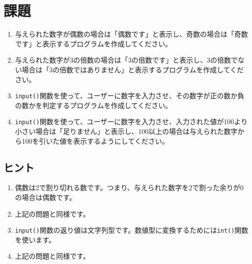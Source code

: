 \documentclass[a4paper,titlepage,dvipdfmx]{jarticle}
\begin{document}
\section{課題}
\begin{enumerate}
  \item 与えられた数字が偶数の場合は「偶数です」と表示し、奇数の場合は「奇数です」と表示するプログラムを作成してください。
  \item 与えられた数字が3の倍数の場合は「3の倍数です」と表示し、3の倍数でない場合は「3の倍数ではありません」と表示するプログラムを作成してください。
  \item \texttt{input()}関数を使って、ユーザーに数字を入力させ、その数字が正の数か負の数かを判定するプログラムを作成してください。
  \item \texttt{input()}関数を使って、ユーザーに数字を入力させ、入力された値が100より小さい場合は「足りません」と表示し、100以上の場合は与えられた数字から100を引いた値を表示するようにしてください。
\end{enumerate}

\subsection*{ヒント}
\begin{enumerate}
  \item 偶数は2で割り切れる数です。つまり、与えられた数字を2で割った余りが0の場合は偶数です。
  \item 上記の問題と同様です。
  \item \texttt{input()}関数の返り値は文字列型です。数値型に変換するためには\texttt{int()}関数を使います。
  \item 上記の問題と同様です。
\end{enumerate}
\end{document}
